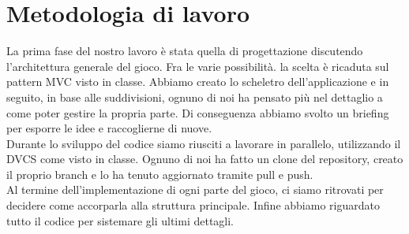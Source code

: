 \documentclass[a4paper,12pt]{report}
\begin{document}
\section{Metodologia di lavoro}
La prima fase del nostro lavoro è stata quella di progettazione discutendo l'architettura generale del gioco. Fra le varie possibilità. la scelta è ricaduta sul pattern MVC visto in classe.
Abbiamo creato lo scheletro dell'applicazione e in seguito, in base alle suddivisioni, ognuno di noi ha pensato più nel dettaglio a come poter gestire la propria parte. Di conseguenza abbiamo svolto un briefing per esporre le idee e raccoglierne di nuove.\\
Durante lo sviluppo del codice siamo riusciti a lavorare in parallelo, utilizzando il DVCS come visto in classe. Ognuno di noi ha fatto un clone del repository, creato il proprio branch e lo ha tenuto aggiornato tramite pull e push.\\
Al termine dell’implementazione di ogni parte del gioco, ci siamo ritrovati per decidere come accorparla alla struttura principale. Infine abbiamo riguardato tutto il codice per sistemare gli ultimi dettagli.
%
\\ \\ 
\end{document}
